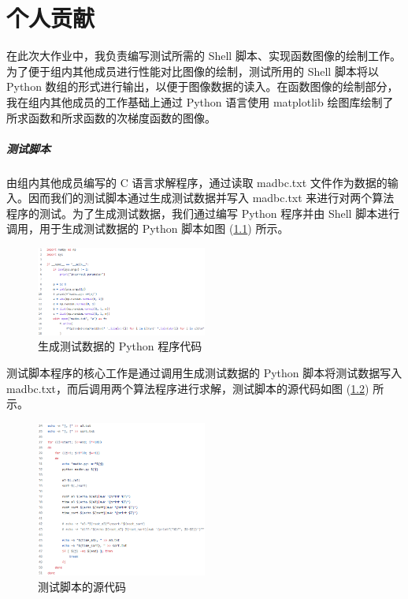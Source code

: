 
\chapter{个人贡献}

在此次大作业中，我负责编写测试所需的 Shell 脚本、实现函数图像的绘制工作。为了便于组内其他成员进行性能对比图像的绘制，测试所用的 Shell 脚本将以 Python 数组的形式进行输出，以便于图像数据的读入。在函数图像的绘制部分，我在组内其他成员的工作基础上通过 Python 语言使用 matplotlib 绘图库绘制了所求函数和所求函数的次梯度函数的图像。

\paragraph{测试脚本}

由组内其他成员编写的 C 语言求解程序，通过读取 madbc.txt 文件作为数据的输入。因而我们的测试脚本通过生成测试数据并写入 madbc.txt 来进行对两个算法程序的测试。为了生成测试数据，我们通过编写 Python 程序并由 Shell 脚本进行调用，用于生成测试数据的 Python 脚本如图 (\ref{Python}) 所示。
\begin{figure}[htb]
    \centering
    \includegraphics[width=0.5\textwidth]{figures/py@madbc.png}
    \caption{生成测试数据的 Python 程序代码}
    \label{Python}
\end{figure}

测试脚本程序的核心工作是通过调用生成测试数据的 Python 脚本将测试数据写入 madbc.txt，而后调用两个算法程序进行求解，测试脚本的源代码如图 (\ref{Test}) 所示。
\begin{figure}[htb]
    \centering
    \includegraphics[width=0.5\textwidth]{figures/sh@test.png}
    \caption{测试脚本的源代码}
    \label{Test}
\end{figure}

